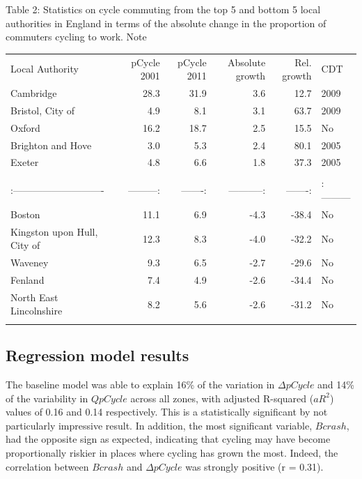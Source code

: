 Table 2: Statistics on cycle commuting from the top 5 and bottom 5 local
authorities in England in terms of the absolute change in the proportion
of commuters cycling to work. Note

\begin{longtable}[c]{@{}lrrrrl@{}}
\toprule\addlinespace
Local Authority & pCycle 2001 & pCycle 2011 & Absolute growth & Rel.
growth & CDT
\\\addlinespace
\midrule\endhead
Cambridge & 28.3 & 31.9 & 3.6 & 12.7 & 2009
\\\addlinespace
Bristol, City of & 4.9 & 8.1 & 3.1 & 63.7 & 2009
\\\addlinespace
Oxford & 16.2 & 18.7 & 2.5 & 15.5 & No
\\\addlinespace
Brighton and Hove & 3.0 & 5.3 & 2.4 & 80.1 & 2005
\\\addlinespace
Exeter & 4.8 & 6.6 & 1.8 & 37.3 & 2005
\\\addlinespace
& & & & &
\\\addlinespace
:---------------------------- & ---------: & -------: & -----------: &
-------: & :---------
\\\addlinespace
Boston & 11.1 & 6.9 & -4.3 & -38.4 & No
\\\addlinespace
Kingston upon Hull, City of & 12.3 & 8.3 & -4.0 & -32.2 & No
\\\addlinespace
Waveney & 9.3 & 6.5 & -2.7 & -29.6 & No
\\\addlinespace
Fenland & 7.4 & 4.9 & -2.6 & -34.4 & No
\\\addlinespace
North East Lincolnshire & 8.2 & 5.6 & -2.6 & -31.2 & No
\\\addlinespace
\bottomrule
\end{longtable}

\subsection{Regression model results}\label{regression-model-results}

The baseline model was able to explain 16\% of the variation in
$\Delta pCycle$ and 14\% of the variability in $Q pCycle$ across all
zones, with adjusted R-squared ($aR^2$) values of 0.16 and 0.14
respectively. This is a statistically significant by not particularly
impressive result. In addition, the most significant variable, $Bcrash$,
had the opposite sign as expected, indicating that cycling may have
become proportionally riskier in places where cycling has grown the
most. Indeed, the correlation between $Bcrash$ and $\Delta pCycle$ was
strongly positive (r = 0.31).


